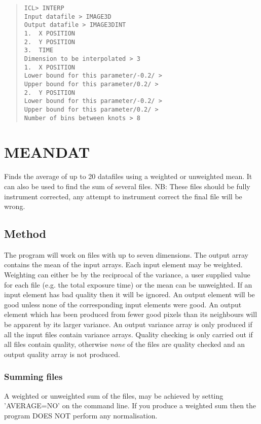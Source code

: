 \documentclass{book}
\renewcommand{\_}{{\tt\char'137}}     %
\begin{document}
\begin{quote}\begin{verbatim}
ICL> INTERP
Input datafile > IMAGE3D
Output datafile > IMAGE3DINT
1.  X POSITION
2.  Y POSITION
3.  TIME
Dimension to be interpolated > 3
1.  X POSITION
Lower bound for this parameter/-0.2/ >
Upper bound for this parameter/0.2/ >
2.  Y POSITION
Lower bound for this parameter/-0.2/ >
Upper bound for this parameter/0.2/ >
Number of bins between knots > 8
\end{verbatim}\end{quote}
\section{MEANDAT}
Finds the average of up to 20 datafiles using a weighted or
unweighted mean. It can also be used to find the sum of several files.
NB: These files should be fully instrument corrected, any attempt to
instrument correct the final file will be wrong.
\subsection{Method}
The program will work on files with up to seven dimensions.
The output array contains the mean of the input arrays. Each input
element may be weighted.
Weighting can either be by the reciprocal of the variance, a user
supplied value for each file (e.g. the total exposure time) or
the mean can be unweighted. If an input element has bad quality then
it will be ignored. An output element will be good unless none of the
corresponding input elements were good. An output element which has
been produced from fewer good pixels than its neighbours will be
apparent by its larger variance. An output variance array is only
produced if all the input files contain variance arrays. Quality
checking is only carried out if all files contain quality, otherwise
{\em none} of the files are quality checked and an output quality array is
not produced.
 
\subsubsection{Summing files}
A weighted or unweighted sum of the files, may be achieved by
setting 'AVERAGE=NO' on the command line. If you produce a weighted
sum then the program DOES NOT perform any normalisation.
 
\end{document}
